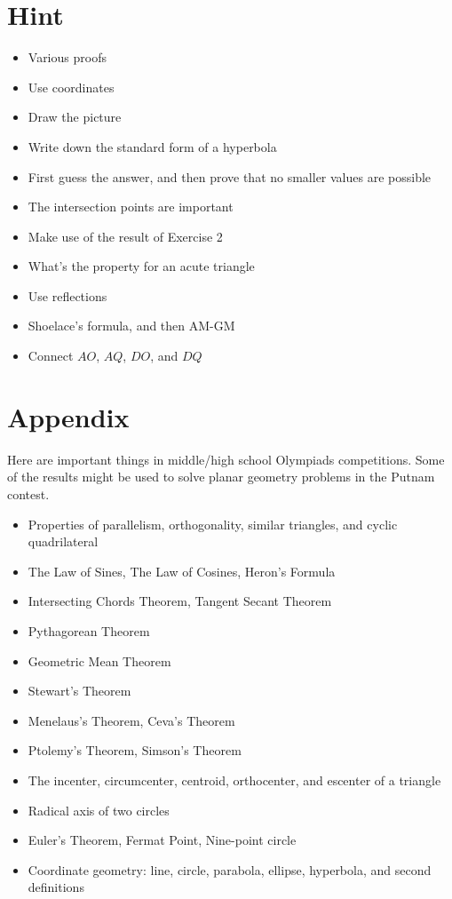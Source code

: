 \documentclass{article}
\theoremstyle{definition}
\theoremstyle{remark}
\begin{document}
\newpage
\section{Hint}
\begin{itemize}
    \item Various proofs 
    \item Use coordinates 
    \item Draw the picture 
    \item Write down the standard form of a hyperbola 
	\item First guess the answer, and then prove that no smaller values are possible
	\item The intersection points are important 
	\item Make use of the result of Exercise 2 
	\item What's the property for an acute triangle 
	\item Use reflections 
    \item Shoelace's formula, and then AM-GM 
    \item Connect $AO$, $AQ$, $DO$, and $DQ$ 
\end{itemize}

\newpage
\section{Appendix}
Here are important things in middle/high school Olympiads competitions. Some of the results might be used to solve planar geometry problems in the Putnam contest.    
\begin{itemize}
    \item Properties of parallelism, orthogonality, similar triangles, and cyclic quadrilateral   
    \item The Law of Sines, The Law of Cosines, Heron's Formula
    \item Intersecting Chords Theorem, Tangent Secant Theorem 
    \item Pythagorean Theorem 
    \item Geometric Mean Theorem 
    \item Stewart's Theorem 
    \item Menelaus's Theorem, Ceva's Theorem 
    \item Ptolemy's Theorem, Simson's Theorem 
    \item The incenter, circumcenter, centroid, orthocenter, and escenter of a triangle 
    \item Radical axis of two circles 
    \item Euler's Theorem, Fermat Point, Nine-point circle 
    \item Coordinate geometry: line, circle, parabola, ellipse, hyperbola, and second definitions  
\end{itemize}
\end{document}
